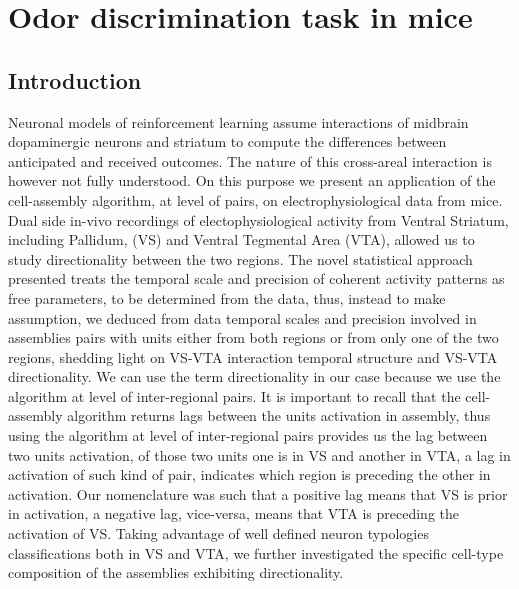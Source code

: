 \chapter{Odor discrimination task in mice}
\label{chap:MaxData}
\section{Introduction}
Neuronal models of reinforcement learning assume interactions of midbrain dopaminergic neurons and striatum to compute the differences between anticipated and received outcomes. The nature of this cross-areal interaction is however not fully understood. On this purpose we present an application of the cell-assembly algorithm, at level of pairs, on electrophysiological data from mice.
Dual side in-vivo recordings of electophysiological activity from Ventral Striatum, including Pallidum, (VS) and Ventral Tegmental Area (VTA), allowed us to study directionality between the two regions.
The novel statistical approach presented treats the temporal scale and precision of coherent activity patterns as free parameters, to be determined from the data, thus, instead to make assumption, we deduced from data temporal scales and precision involved in assemblies pairs with units either from both regions or from only one of the two regions, shedding light on VS-VTA interaction temporal structure and VS-VTA directionality.
We can use the term directionality in our case because we use the algorithm at level of inter-regional pairs. It is important to recall that the cell-assembly algorithm returns lags between the units activation in assembly, thus using the algorithm at level of inter-regional pairs provides us the lag between two units activation, of those two units one is in VS and another in VTA, a lag in activation of such kind of pair, indicates which region is preceding the other in activation.
Our nomenclature was such that a positive lag means that VS is prior in activation, a negative lag, vice-versa, means that VTA is preceding the activation of VS.
Taking advantage of well defined neuron typologies classifications both in VS and VTA, we further investigated the specific cell-type composition of the assemblies exhibiting directionality. 
